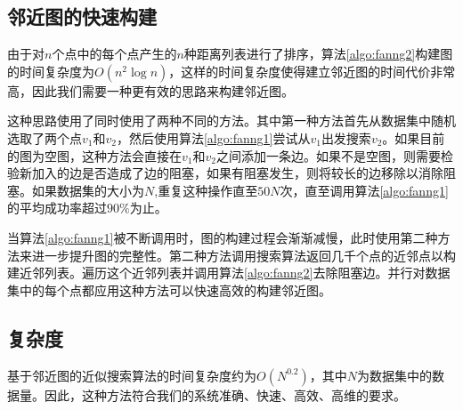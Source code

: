 \subsection{邻近图的快速构建}

由于对$n$个点中的每个点产生的$n$种距离列表进行了排序，算法\ref{algo:fanng2}构建图的时间复杂度为$O(n^2\log{n})$，这样的时间复杂度使得建立邻近图的时间代价非常高，因此我们需要一种更有效的思路来构建邻近图。

这种思路使用了同时使用了两种不同的方法。其中第一种方法首先从数据集中随机选取了两个点$v_1$和$v_2$，然后使用算法\ref{algo:fanng1}尝试从$v_1$出发搜索$v_2$。如果目前的图为空图，这种方法会直接在$v_1$和$v_2$之间添加一条边。如果不是空图，则需要检验新加入的边是否造成了边的阻塞，如果有阻塞发生，则将较长的边移除以消除阻塞。如果数据集的大小为$N$,重复这种操作直至$50N$次，直至调用算法\ref{algo:fanng1}的平均成功率超过$90\%$为止。

当算法\ref{algo:fanng1}被不断调用时，图的构建过程会渐渐减慢，此时使用第二种方法来进一步提升图的完整性。第二种方法调用搜索算法返回几千个点的近邻点以构建近邻列表。遍历这个近邻列表并调用算法\ref{algo:fanng2}去除阻塞边。并行对数据集中的每个点都应用这种方法可以快速高效的构建邻近图。

\subsection{复杂度}

基于邻近图的近似搜索算法的时间复杂度约为$O(N^{0.2})$，其中$N$为数据集中的数据量\cite{harwood2016fanng}。因此，这种方法符合我们的系统准确、快速、高效、高维的要求。


